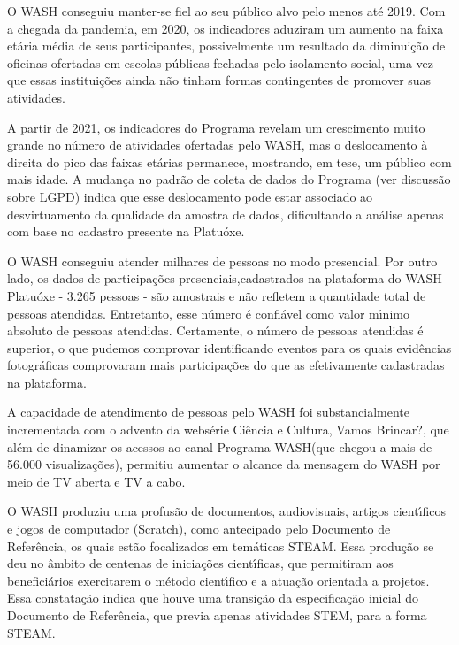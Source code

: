 \documentclass[
12pt,		%
openright,	%
twoside,  %
a4paper,			%
chapter=TITLE,		%
english,			%
french,				%
spanish,			%
brazil				%
]{USPSC-classe/USPSC}
\begin{document}
\begin{alineas}
\item O WASH conseguiu manter-se fiel ao seu p\'ublico alvo pelo menos at\'e 2019. Com a chegada da pandemia, em 2020, os indicadores  aduziram um aumento na faixa et\'aria m\'edia de seus participantes, possivelmente um resultado da diminui\c{c}\~ao de oficinas ofertadas em escolas p\'ublicas fechadas pelo isolamento social, uma vez que essas institui\c{c}\~oes ainda n\~ao tinham formas contingentes de promover suas atividades.
\item A partir de 2021, os indicadores do Programa revelam um crescimento muito grande no n\'umero de atividades ofertadas pelo WASH, mas o deslocamento \`a direita do pico das faixas et\'arias permanece, mostrando, em tese, um p\'ublico com mais idade. A mudan\c{c}a no padr\~ao de coleta de dados do Programa (ver discuss\~ao sobre LGPD) indica que esse deslocamento pode estar associado ao desvirtuamento da qualidade da amostra de dados, dificultando a an\'alise apenas com base no cadastro presente na Platu\'oxe.
\item O WASH conseguiu atender milhares de pessoas no modo presencial. Por outro lado, os dados de participa\c{c}\~oes presenciais,cadastrados na plataforma do WASH Platu\'oxe - 3.265 pessoas - s\~ao amostrais e n\~ao refletem a quantidade total de pessoas atendidas. Entretanto, esse n\'umero \'e confi\'avel como valor m\'{\i}nimo absoluto de pessoas atendidas. Certamente, o n\'umero de pessoas atendidas \'e  superior, o que pudemos comprovar identificando eventos para os quais evid\^encias fotogr\'aficas comprovaram mais participa\c{c}\~oes do que as efetivamente cadastradas na plataforma.
\item A capacidade de atendimento de pessoas pelo WASH foi substancialmente incrementada com o advento da webs\'erie \textquotedbl Ci\^encia e Cultura, Vamos Brincar?\textquotedbl , que al\'em de dinamizar os acessos ao canal \textquotedbl Programa WASH\textquotedbl  (que chegou a mais de 56.000 visualiza\c{c}\~oes), permitiu  aumentar o alcance da mensagem do WASH por meio de TV aberta e TV a cabo.
\item O WASH produziu uma profus\~ao de documentos, audiovisuais, artigos cient\'{\i}ficos e jogos de computador (Scratch), como antecipado pelo Documento de Refer\^encia, os quais est\~ao focalizados em tem\'aticas STEAM. Essa produ\c{c}\~ao se deu no \^ambito de centenas de inicia\c{c}\~oes cient\'{\i}ficas, que permitiram aos benefici\'arios exercitarem o m\'etodo cient\'{\i}fico e a atua\c{c}\~ao orientada a projetos. Essa constata\c{c}\~ao indica que houve uma transi\c{c}\~ao da especifica\c{c}\~ao inicial do Documento de Refer\^encia, que previa apenas atividades STEM, para a forma STEAM.

\end{alineas}
\end{document}
